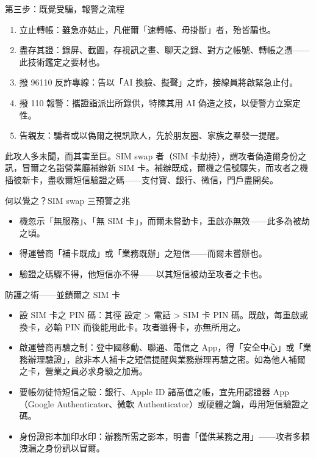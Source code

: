 \begin{tcbwarn}{第三步：既覺受騙，報警之流程}
\begin{enumerate}
  \item 立止轉帳：雖急亦姑止，凡催爾「速轉帳、毋掛斷」者，殆皆騙也。
  \item 盡存其證：錄屏、截圖，存視訊之畫、聊天之錄、對方之帳號、轉帳之憑——此技術鑑定之要材也。
  \item 撥 96110 反詐專線：告以「AI 換臉、擬聲」之詐，接線員將啟緊急止付。
  \item 撥 110 報警：攜證詣派出所錄供，特陳其用 AI 偽造之技，以便警方立案定性。
  \item 告親友：騙者或以偽爾之視訊欺人，先於朋友圈、家族之羣發一提醒。
\end{enumerate}

\end{tcbwarn}


此攻人多未聞，而其害至巨。SIM swap 者（SIM 卡劫持），謂攻者偽造爾身份之訊，冒爾之名詣營業廳補辦新 SIM 卡。補辦既成，爾機之信號驟失，而攻者之機插彼新卡，盡收爾短信驗證之碼——支付寶、銀行、微信，門戶盡開矣。

\begin{tcbinfo}{何以覺之？SIM swap 三預警之兆}
\begin{itemize}
  \item 機忽示「無服務」、「無 SIM 卡」，而爾未嘗動卡，重啟亦無效——此多為被劫之頃。
  \item 得運營商「補卡既成」或「業務既辦」之短信——而爾未嘗辦也。
  \item 驗證之碼驟不得，他短信亦不得——以其短信被劫至攻者之卡也。
\end{itemize}

\end{tcbinfo}

\begin{tcbwarn}{防護之術——並鎖爾之 SIM 卡}
\begin{itemize}
  \item 設 SIM 卡之 PIN 碼：其徑 設定 > 電話 > SIM 卡 PIN 碼。既啟，每重啟或換卡，必輸 PIN 而後能用此卡。攻者雖得卡，亦無所用之。
  \item 啟運營商再驗之制：登中國移動、聯通、電信之 App，得「安全中心」或「業務辦理驗證」，啟非本人補卡之短信提醒與業務辦理再驗之密。如為他人補爾之卡，營業之員必求身驗之加焉。
  \item 要帳勿徒恃短信之驗：銀行、Apple ID 諸高值之帳，宜先用認證器 App（Google Authenticator、微軟 Authenticator）或硬體之鑰，毋用短信驗證之碼。
  \item 身份證影本加印水印：辦務所需之影本，明書「僅供某務之用」——攻者多賴洩漏之身份訊以冒爾。
\end{itemize}

\end{tcbwarn}

